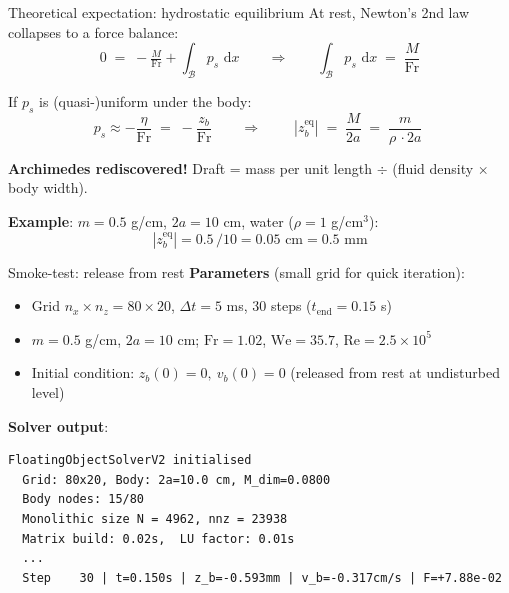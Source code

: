 \documentclass[aspectratio=169, 10pt]{beamer}
\newcommand{\Fr}{\mathrm{Fr}}
\newcommand{\We}{\mathrm{We}}
\newcommand{\Rey}{\mathrm{Re}}
\newcommand{\dd}{\,\mathrm{d}}
\begin{document}
\begin{frame}{Theoretical expectation: hydrostatic equilibrium}
At rest, Newton's 2nd law collapses to a force balance:
\[
0 \;=\; -\tfrac{M}{\Fr} + \int_\mathcal{B} p_s\,\dd x
\qquad\Longrightarrow\qquad
\int_\mathcal{B} p_s\,\dd x \;=\; \frac{M}{\Fr}
\]

\vspace{0.5em}
If $p_s$ is (quasi-)uniform under the body:
\[
p_s \approx -\frac{\eta}{\Fr} \;=\; -\frac{z_b}{\Fr}
\qquad\Longrightarrow\qquad
\boxed{\;|z_b^{\text{eq}}| \;=\; \frac{M}{2a} \;=\; \frac{m}{\rho\,\cdot 2a}\;}
\]

\vspace{0.5em}
\textbf{Archimedes rediscovered!} Draft = mass per unit length $\div$ (fluid density $\times$ body width).

\vspace{0.8em}
\small
\textbf{Example}: $m = 0.5$ g/cm, $2a = 10$ cm, water ($\rho = 1$ g/cm$^3$):
\[
|z_b^{\text{eq}}| = 0.5\,/10 = 0.05 \text{ cm} = 0.5 \text{ mm}
\]
\end{frame}

\begin{frame}[fragile]{Smoke-test: release from rest}
\textbf{Parameters} (small grid for quick iteration):
\begin{itemize}
\small
\item Grid $n_x \times n_z = 80 \times 20$, $\Delta t = 5$ ms, 30 steps ($t_{\text{end}} = 0.15$ s)
\item $m = 0.5$ g/cm, $2a = 10$ cm; $\Fr=1.02$, $\We=35.7$, $\Rey=2.5\!\times\!10^5$
\item Initial condition: $z_b(0)=0,\ v_b(0)=0$ (released from rest at undisturbed level)
\end{itemize}

\vspace{0.5em}
\textbf{Solver output}:
\begin{block}{}
\begin{verbatim}
FloatingObjectSolverV2 initialised
  Grid: 80x20, Body: 2a=10.0 cm, M_dim=0.0800
  Body nodes: 15/80
  Monolithic size N = 4962, nnz = 23938
  Matrix build: 0.02s,  LU factor: 0.01s
  ...
  Step    30 | t=0.150s | z_b=-0.593mm | v_b=-0.317cm/s | F=+7.88e-02
\end{verbatim}
\end{block}
\end{frame}
\end{document}
